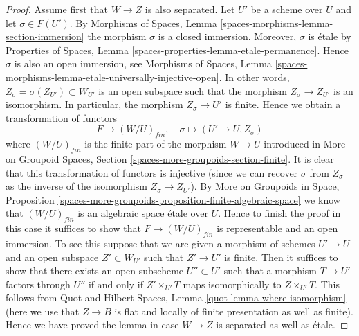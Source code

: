 \begin{proof}
Assume first that $W \to Z$ is also separated.
Let $U'$ be a scheme over $U$ and let $\sigma \in F(U')$. By
Morphisms of Spaces, Lemma \ref{spaces-morphisms-lemma-section-immersion}
the morphism $\sigma$ is a closed immersion.
Moreover, $\sigma$ is \'etale by
Properties of Spaces, Lemma \ref{spaces-properties-lemma-etale-permanence}.
Hence $\sigma$ is also an open immersion, see
Morphisms of Spaces,
Lemma \ref{spaces-morphisms-lemma-etale-universally-injective-open}.
In other words, $Z_\sigma = \sigma(Z_{U'}) \subset W_{U'}$ is
an open subspace such that the morphism $Z_\sigma \to Z_{U'}$
is an isomorphism. In particular, the morphism $Z_\sigma \to U'$
is finite. Hence we obtain a transformation of functors
$$
F \longrightarrow (W/U)_{fin},\quad
\sigma \longmapsto (U' \to U, Z_\sigma)
$$
where $(W/U)_{fin}$ is the finite part of the morphism $W \to U$
introduced in
More on Groupoid Spaces, Section \ref{spaces-more-groupoids-section-finite}.
It is clear that this transformation of functors is injective (since we can
recover $\sigma$ from $Z_\sigma$ as the inverse of the isomorphism
$Z_\sigma \to Z_{U'}$). By
More on Groupoids in Space, Proposition
\ref{spaces-more-groupoids-proposition-finite-algebraic-space}
we know that $(W/U)_{fin}$ is an algebraic space \'etale over $U$.
Hence to finish the proof in this case it suffices to show that
$F \to (W/U)_{fin}$ is representable and an open immersion.
To see this suppose that we are given a morphism of schemes $U' \to U$
and an open subspace $Z' \subset W_{U'}$ such that $Z' \to U'$
is finite. Then it suffices to show that there exists an
open subscheme $U'' \subset U'$ such that a morphism
$T \to U'$ factors through $U''$ if and only if $Z' \times_{U'} T$
maps isomorphically to $Z \times_{U'} T$. This follows from
Quot and Hilbert Spaces, Lemma \ref{quot-lemma-where-isomorphism}
(here we use that $Z \to B$ is flat and locally of finite presentation
as well as finite).
Hence we have proved the lemma in case $W \to Z$ is separated
as well as \'etale.


\end{proof}
